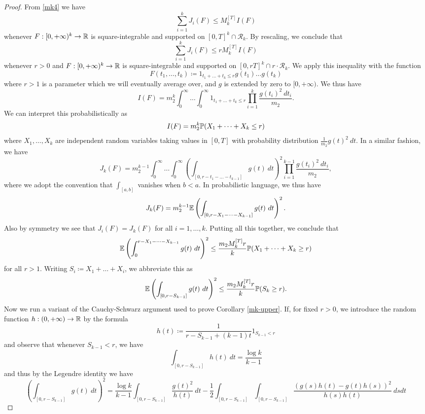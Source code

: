 \begin{proof}  From \eqref{mk4} we have
$$ \sum_{i=1}^k J_i(F) \leq M_k^{[T]} I(F)$$
whenever $F: [0,+\infty)^k \to \R$ is square-integrable and supported on $[0,T]^k \cap {\mathcal R}_k$.  By rescaling, we conclude that
$$ \sum_{i=1}^k J_i(F) \leq r M_k^{[T]} I(F)$$
whenever $r>0$ and $F: [0,+\infty)^k \to \R$ is square-integrable and supported on $[0,rT]^k \cap r \cdot {\mathcal R}_k$.  We apply this inequality with the function
$$ F(t_1,\dots,t_k) \coloneqq 1_{t_1+\dots+t_k \leq r} g(t_1) \dots g(t_k)$$
where $r>1$ is a parameter which we will eventually average over, and $g$ is extended by zero to $[0,+\infty)$.  We thus have
$$ I(F) = m_2^k \int_0^\infty \dots \int_0^\infty 1_{t_1+\dots+t_k \leq r} \prod_{i=1}^k \frac{g(t_i)^2\ dt_i}{m_2}.$$
We can interpret this probabilistically as
$$ I(F) = m_2^k \P( X_1 + \dots + X_k \leq r )$$
where $X_1,\dots,X_k$ are independent random variables taking values in $[0,T]$ with probability distribution $\frac{1}{m_2} g(t)^2\ dt$.  In a similar fashion, we have
$$ J_k(F) = m_2^{k-1} \int_0^\infty \dots \int_0^\infty\left (\int_{[0,r-t_1-\dots-t_{k-1}]} g(t)\ dt\right)^2 \prod_{i=1}^{k-1} \frac{g(t_i)^2\ dt_i}{m_2},$$
where we adopt the convention that $\int_{[a,b]}$ vanishes when $b<a$.  In probabilistic language, we thus have
$$ J_k(F) = m_2^{k-1} \E \left(\int_{[0,r-X_1-\dots-X_{k-1}]} g(t)\ dt\right)^2.$$
Also by symmetry we see that $J_i(F)=J_k(F)$ for all $i=1,\dots,k$.  Putting all this together, we conclude that
$$\E \left(\int_0^{r-X_1-\dots-X_{k-1}} g(t)\ dt\right)^2 \leq \frac{m_2 M_k^{[T]} r}{k} \P( X_1 + \dots + X_k \geq r )$$
for all $r>1$.  Writing $S_i \coloneqq X_1 + \dots + X_i$, we abbreviate this as
\begin{equation}\label{rg1}
\E \left(\int_{[0,r-S_{k-1}]} g(t)\ dt\right)^2 \leq \frac{m_2 M_k^{[T]} r}{k} \P( S_k \geq r ).
\end{equation}
Now we run a variant of the Cauchy-Schwarz argument used to prove Corollary \ref{mk-upper}.  If, for fixed $r>0$, we introduce the random function $h: (0,+\infty) \to \R$ by the formula
\begin{equation}\label{hdef}
 h(t) \coloneqq \frac{1}{r-S_{k-1}+(k-1)t} 1_{S_{k-1} < r}
\end{equation}
and observe that whenever $S_{k-1} < r$, we have
\begin{equation}\label{h-int}
 \int_{[0,r-S_{k-1}]} h(t)\ dt = \frac{\log k}{k-1}
\end{equation}
and thus by the Legendre identity we have
$$ \left(\int_{[0,r-S_{k-1}]} g(t)\ dt\right)^2 = \frac{\log k}{k-1} \int_{[0,r-S_{k-1}]} \frac{g(t)^2}{h(t)}\ dt - \frac{1}{2} \int_{[0,r-S_{k-1}]} \int_{[0,r-S_{k-1}]} \frac{(g(s)h(t)-g(t)h(s))^2}{h(s)h(t)}\ ds dt$$

\end{proof}
